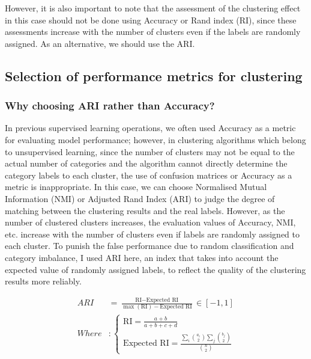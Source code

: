 \documentclass[journal]{IEEEtai}
\begin{document}
However, it is also important to note that the assessment of the clustering effect in this case should not be done using Accuracy or Rand index (RI), since these assessments increase with the number of clusters even if the labels are randomly assigned. As an alternative, we should use the ARI.

\subsection{\textbf{Selection of performance metrics for clustering}}
\subsubsection{\textbf{Why choosing ARI rather than Accuracy?}}
In previous supervised learning operations, we often used Accuracy as a metric for evaluating model performance; however, in clustering algorithms which belong to unsupervised learning, since the number of clusters may not be equal to the actual number of categories and the algorithm cannot directly determine the category labels to each cluster, the use of confusion matrices or Accuracy as a metric is inappropriate. In this case, we can choose Normalised Mutual Information (NMI) or Adjusted Rand Index (ARI) to judge the degree of matching between the clustering results and the real labels. However, as the number of clustered clusters increases, the evaluation values of Accuracy, NMI, etc. increase with the number of clusters even if labels are randomly assigned to each cluster. To punish the false performance due to random classification and category imbalance, I used ARI here, an index that takes into account the expected value of randomly assigned labels, to reflect the quality of the clustering results more reliably.

\begin{center}
	\begin{align} 
		ARI &= \frac{\text{RI} - \text{Expected RI}}{\max(\text{RI}) - \text{Expected RI}} \in [-1,1]
		\\ Where&:
		\left\{\begin{matrix}
			\text{RI} = \frac{a + b}{a + b + c + d}
			\\
			\text{Expected RI} = \frac{\sum_i \binom{a_i}{2} \sum_j \binom{b_j}{2}}{\binom{n}{2}}
		\end{matrix}\right.
	\end{align}
	\begin{flushleft}
	\end{flushleft}
\end{center}
\end{document}
